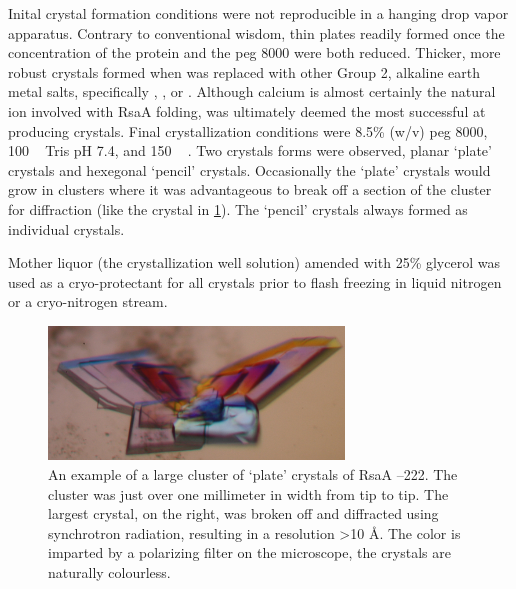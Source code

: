  Inital crystal formation conditions were  not reproducible in 
a hanging drop vapor apparatus. Contrary to conventional wisdom, thin plates readily formed once the concentration
of the protein and the \ac{peg} 8000 were both reduced. Thicker, more robust crystals
formed when  was replaced with other Group 2, alkaline earth metal salts, specifically , , or . Although calcium is almost certainly the natural ion involved with RsaA folding,  was ultimately
deemed the most successful at producing crystals. Final crystallization
conditions were 8.5\% (w/v) \ac{peg} 8000, 100 \si{\milli\molar} Tris pH 7.4, and 150 \si{\milli\molar} .
Two crystals forms were observed, planar `plate' crystals and hexegonal
`pencil' crystals. Occasionally the `plate' crystals would grow in clusters where it was advantageous to break off a section of the cluster for diffraction (like the crystal in \cref{fig:crystal-flower}). The `pencil' crystals always formed as individual crystals.

 Mother liquor (\ie the crystallization well solution) amended with 25\% glycerol was used as a cryo-protectant for all
crystals prior to flash freezing in liquid nitrogen or a cryo-nitrogen stream.

\begin{figure}[htb]
  	\begin{center}
   		\includegraphics[width=0.7\textwidth]{crystal_chapter/img/bigflowerxtal.jpg}
   	\end{center}
   	\caption[Example of a large cluster of `plate' RsaA --222 crystals]{An
      example of a large cluster of `plate' crystals of RsaA --222. The
      cluster was just over one millimeter in width from tip to tip. The largest
      crystal, on the right, was broken off and diffracted using synchrotron
      radiation, resulting in a resolution >10 \AA. The color is imparted by a polarizing filter on the microscope, the crystals are naturally colourless.}
   	\label{fig:crystal-flower}
\end{figure}

